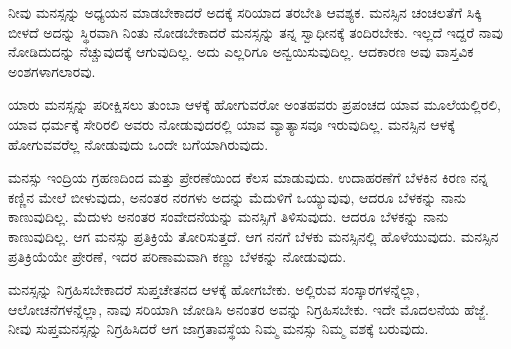 ನೀವು ಮನಸ್ಸನ್ನು ಅಧ್ಯಯನ ಮಾಡಬೇಕಾದರೆ ಅದಕ್ಕೆ ಸರಿಯಾದ ತರಬೇತಿ ಆವಶ್ಯಕ. ಮನಸ್ಸಿನ ಚಂಚಲತೆಗೆ ಸಿಕ್ಕಿ ಬೀಳದೆ ಅದನ್ನು ಸ್ಥಿರವಾಗಿ ನಿಂತು ನೋಡಬೇಕಾದರೆ ಮನಸ್ಸನ್ನು ತನ್ನ ಸ್ವಾಧೀನಕ್ಕೆ ತಂದಿರಬೇಕು. ಇಲ್ಲದೆ ಇದ್ದರೆ ನಾವು ನೋಡಿದುದನ್ನು ನೆಚ್ಚುವುದಕ್ಕೆ ಆಗುವುದಿಲ್ಲ. ಅದು ಎಲ್ಲರಿಗೂ ಅನ್ವಯಿಸುವುದಿಲ್ಲ. ಆದಕಾರಣ ಅವು ವಾಸ್ತವಿಕ ಅಂಶಗಳಾಗಲಾರವು.

ಯಾರು ಮನಸ್ಸನ್ನು ಪರೀಕ್ಷಿಸಲು ತುಂಬಾ ಆಳಕ್ಕೆ ಹೋಗುವರೋ ಅಂತಹವರು ಪ್ರಪಂಚದ ಯಾವ ಮೂಲೆಯಲ್ಲಿರಲಿ, ಯಾವ ಧರ್ಮಕ್ಕೆ ಸೇರಿರಲಿ ಅವರು ನೋಡುವುದರಲ್ಲಿ ಯಾವ ವ್ಯಾತ್ಯಾಸವೂ ಇರುವುದಿಲ್ಲ. ಮನಸ್ಸಿನ ಆಳಕ್ಕೆ ಹೋಗುವವರೆಲ್ಲ ನೋಡುವುದು ಒಂದೇ ಬಗೆಯಾಗಿರುವುದು.

ಮನಸ್ಸು ಇಂದ್ರಿಯ ಗ್ರಹಣದಿಂದ ಮತ್ತು ಪ್ರೇರಣೆಯಿಂದ ಕೆಲಸ ಮಾಡುವುದು. ಉದಾಹರಣೆಗೆ ಬೆಳಕಿನ ಕಿರಣ ನನ್ನ ಕಣ್ಣಿನ ಮೇಲೆ ಬೀಳುವುದು, ಅನಂತರ ನರಗಳು ಅದನ್ನು ಮೆದುಳಿಗೆ ಒಯ್ಯುವುವು, ಆದರೂ ಬೆಳಕನ್ನು ನಾನು ಕಾಣುವುದಿಲ್ಲ. ಮೆದುಳು ಅನಂತರ ಸಂವೇದನೆಯನ್ನು ಮನಸ್ಸಿಗೆ ತಿಳಿಸುವುದು. ಆದರೂ ಬೆಳಕನ್ನು ನಾನು ಕಾಣುವುದಿಲ್ಲ. ಆಗ ಮನಸ್ಸು ಪ್ರತಿಕ್ರಿಯೆ ತೋರಿಸುತ್ತದೆ. ಆಗ ನನಗೆ ಬೆಳಕು ಮನಸ್ಸಿನಲ್ಲಿ ಹೊಳೆಯುವುದು. ಮನಸ್ಸಿನ ಪ್ರತಿಕ್ರಿಯೆಯೇ ಪ್ರೇರಣೆ, ಇದರ ಪರಿಣಾಮವಾಗಿ ಕಣ್ಣು ಬೆಳಕನ್ನು ನೋಡುವುದು.

ಮನಸ್ಸನ್ನು ನಿಗ್ರಹಿಸಬೇಕಾದರೆ ಸುಪ್ತಚೇತನದ ಆಳಕ್ಕೆ ಹೋಗಬೇಕು. ಅಲ್ಲಿರುವ ಸಂಸ್ಕಾರಗಳನ್ನೆಲ್ಲಾ, ಆಲೋಚನೆಗಳನ್ನೆಲ್ಲಾ, ನಾವು ಸರಿಯಾಗಿ ಜೋಡಿಸಿ ಅನಂತರ ಅವನ್ನು ನಿಗ್ರಹಿಸಬೇಕು. ಇದೇ ಮೊದಲನೆಯ ಹೆಜ್ಜೆ. ನೀವು ಸುಪ್ತಮನಸ್ಸನ್ನು ನಿಗ್ರಹಿಸಿದರೆ ಆಗ ಜಾಗ್ರತಾವಸ್ಥೆಯ ನಿಮ್ಮ ಮನಸ್ಸು ನಿಮ್ಮ ವಶಕ್ಕೆ ಬರುವುದು.

